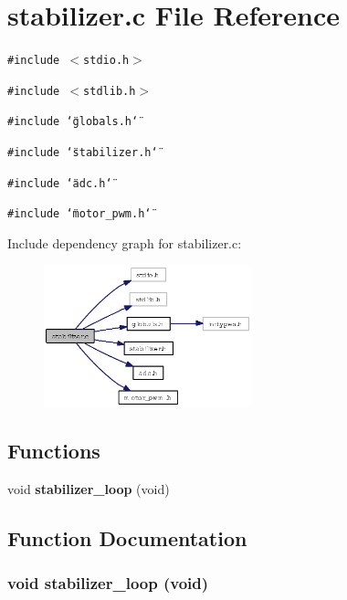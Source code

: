 \section{stabilizer.c File Reference}
\label{stabilizer_8c}
{\tt \#include $<$stdio.h$>$}\par
{\tt \#include $<$stdlib.h$>$}\par
{\tt \#include \char`\"{}globals.h\char`\"{}}\par
{\tt \#include \char`\"{}stabilizer.h\char`\"{}}\par
{\tt \#include \char`\"{}adc.h\char`\"{}}\par
{\tt \#include \char`\"{}motor\_\-pwm.h\char`\"{}}\par


Include dependency graph for stabilizer.c:\begin{figure}[H]
\begin{center}
\leavevmode
\includegraphics[width=170pt]{stabilizer_8c__incl}
\end{center}
\end{figure}
\subsection*{Functions}
\begin{CompactItemize}
\item 
void {\bf stabilizer\_\-loop} (void)
\end{CompactItemize}


\subsection{Function Documentation}
\subsubsection{\setlength{\rightskip}{0pt plus 5cm}void stabilizer\_\-loop (void)}\label{stabilizer_8c_cc3a7bb7e4532b65fe366e14f3778f86}




